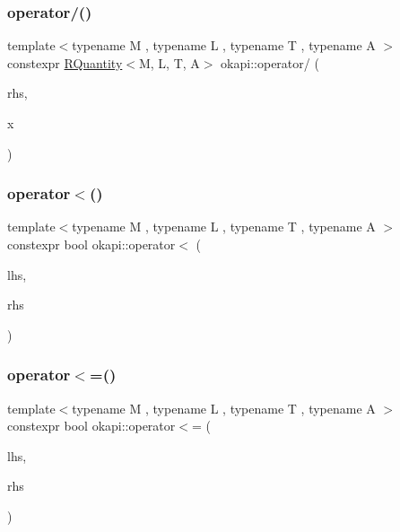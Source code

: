 \subsubsection{\texorpdfstring{operator/()}{operator/()}\hspace{0.1cm}{\footnotesize\ttfamily [3/3]}}
{\footnotesize\ttfamily template$<$typename M , typename L , typename T , typename A $>$ \\
constexpr \mbox{\hyperlink{classokapi_1_1RQuantity}{R\+Quantity}}$<$M, L, T, A$>$ okapi\+::operator/ (\begin{DoxyParamCaption}\item[{const \mbox{\hyperlink{classokapi_1_1RQuantity}{R\+Quantity}}$<$ M, L, T, A $>$ \&}]{rhs,  }\item[{const double \&}]{x }\end{DoxyParamCaption})}

\mbox{\label{namespaceokapi_a9f4f432db976a139cc66ab71bfbe5ca9}} 
\subsubsection{\texorpdfstring{operator$<$()}{operator<()}}
{\footnotesize\ttfamily template$<$typename M , typename L , typename T , typename A $>$ \\
constexpr bool okapi\+::operator$<$ (\begin{DoxyParamCaption}\item[{const \mbox{\hyperlink{classokapi_1_1RQuantity}{R\+Quantity}}$<$ M, L, T, A $>$ \&}]{lhs,  }\item[{const \mbox{\hyperlink{classokapi_1_1RQuantity}{R\+Quantity}}$<$ M, L, T, A $>$ \&}]{rhs }\end{DoxyParamCaption})}

\mbox{\label{namespaceokapi_ae23323562f9b7d57d066a04b5de73f3d}} 
\subsubsection{\texorpdfstring{operator$<$=()}{operator<=()}}
{\footnotesize\ttfamily template$<$typename M , typename L , typename T , typename A $>$ \\
constexpr bool okapi\+::operator$<$= (\begin{DoxyParamCaption}\item[{const \mbox{\hyperlink{classokapi_1_1RQuantity}{R\+Quantity}}$<$ M, L, T, A $>$ \&}]{lhs,  }\item[{const \mbox{\hyperlink{classokapi_1_1RQuantity}{R\+Quantity}}$<$ M, L, T, A $>$ \&}]{rhs }\end{DoxyParamCaption})}

